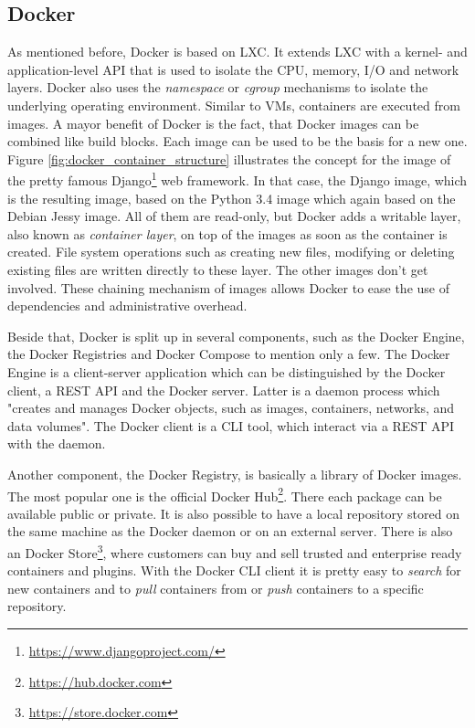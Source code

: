 \subsection{Docker}
As mentioned before, Docker is based on \ac{LXC}.
It extends \ac{LXC} with a kernel- and application-level API that is used to isolate the CPU, memory, I/O and network layers.\autocite[cf.][p. 82]{Bernstein:2014}
Docker also uses the \textit{namespace} or \textit{cgroup} mechanisms to isolate the underlying operating environment.\autocite[cf.][p. 82]{Bernstein:2014}
Similar to \acp{VM}, containers are executed from images.
A mayor benefit of Docker is the fact, that Docker images can be combined like build blocks.
Each image can be used to be the basis for a new one.
Figure \ref{fig:docker_container_structure} illustrates the concept for the image of the pretty famous Django\footnote{\url{https://www.djangoproject.com/}} web framework.
In that case, the Django image, which is the resulting image, based on the Python 3.4 image which again based on the Debian Jessy image.
All of them are read-only, but Docker adds a writable layer, also known as \textit{container layer}, on top of the images as soon as the container is created.
File system operations such as creating new files, modifying or deleting existing files are written directly to these layer.\autocite[cf.]{dockerImages}
The other images don't get involved.
These chaining mechanism of images allows Docker to ease the use of dependencies and administrative overhead.

Beside that, Docker is split up in several components, such as the Docker Engine, the Docker Registries and Docker Compose to mention only a few.
The Docker Engine is a client-server application which can be distinguished by the Docker client, a \ac{REST} \ac{API} and the Docker server.
Latter is a daemon process which "creates and manages Docker objects, such as images, containers, networks, and data volumes"\autocite{dockerEngine}.
The Docker client is a \ac{CLI} tool, which interact via a \ac{REST} \ac{API} with the daemon.\autocite[cf.]{dockerEngine}

Another component, the Docker Registry, is basically a library of Docker images.
The most popular one is the official Docker Hub\footnote{\url{https://hub.docker.com}}.
There each package can be available public or private.
It is also possible to have a local repository stored on the same machine as the Docker daemon or on an external server.\autocite[cf.]{dockerEngine}
There is also an Docker Store\footnote{\url{https://store.docker.com}}, where customers can buy and sell trusted and enterprise ready containers and plugins.
With the Docker \ac{CLI} client it is pretty easy to \textit{search} for new containers and to \textit{pull} containers from or \textit{push} containers to a specific repository.

